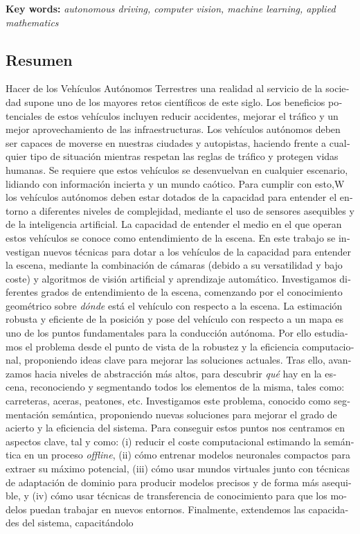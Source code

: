 \vspace{1mm}
\textbf{Key words:} \textit{autonomous driving, computer vision, machine learning, applied mathematics}


\begin{otherlanguage}{spanish}
\chapter*{Resumen}

\vspace{-24mm}

Hacer de los Vehículos Autónomos Terrestres una realidad al servicio de la sociedad supone uno de los mayores retos científicos de este siglo. Los beneficios potenciales de estos vehículos incluyen reducir accidentes, mejorar el tráfico y un mejor aprovechamiento de las infraestructuras. Los vehículos autónomos deben ser capaces de moverse en nuestras ciudades y autopistas, haciendo frente a cualquier tipo de situación mientras respetan las reglas de tráfico y protegen vidas humanas. Se requiere que estos vehículos se desenvuelvan en cualquier escenario, lidiando con información incierta y un mundo caótico. Para cumplir con esto,W los vehículos autónomos deben estar dotados de la capacidad para entender el entorno a diferentes niveles de complejidad, mediante el uso de sensores asequibles y de la inteligencia artificial. La capacidad de entender el medio en el que operan estos vehículos se conoce como entendimiento de la escena. En este trabajo se investigan nuevos técnicas para dotar a los vehículos de la capacidad para entender la escena, mediante la combinación de cámaras (debido a su versatilidad y bajo coste) y algoritmos de visión artificial y aprendizaje automático. Investigamos diferentes grados de entendimiento de la escena, comenzando por el conocimiento geométrico sobre \textit{dónde} está el vehículo con respecto a la escena. La estimación robusta y eficiente de la posición y pose del vehículo con respecto a un mapa es uno de los puntos fundamentales para la conducción autónoma. Por ello estudiamos el problema desde el punto de vista de la robustez y la eficiencia computacional, proponiendo ideas clave para mejorar las soluciones actuales. Tras ello, avanzamos hacia niveles de abstracción más altos, para descubrir \textit{qué} hay en la escena, reconociendo y segmentando todos los elementos de la misma, tales como: carreteras, aceras, peatones, etc. Investigamos este problema, conocido como segmentación semántica, proponiendo nuevas soluciones para mejorar el grado de acierto y la eficiencia del sistema. Para conseguir estos puntos nos centramos en aspectos clave, tal y como: (i) reducir el coste computacional estimando la semántica en un proceso \textit{offline}, (ii) cómo entrenar modelos neuronales compactos para extraer su máximo potencial, (iii) cómo usar mundos virtuales junto con técnicas de adaptación de dominio para producir modelos precisos y de forma más asequible, y (iv) cómo usar técnicas de transferencia de conocimiento para que los modelos puedan trabajar en nuevos entornos. Finalmente, extendemos las capacidades del sistema, capacitándolo 
\end{otherlanguage}
